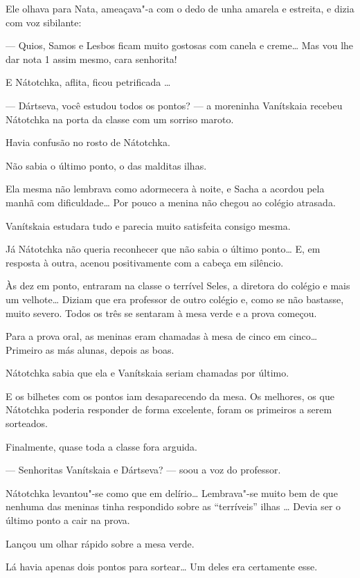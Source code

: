 Ele olhava para Nata, ameaçava"-a com o dedo de unha amarela e estreita,
e dizia com voz sibilante:

--- Quios, Samos e Lesbos ficam muito gostosas com canela e creme\ldots{} Mas
vou lhe dar nota 1 assim mesmo, cara senhorita!

E Nátotchka, aflita, ficou petrificada \ldots{}

\asterisc

--- Dártseva, você estudou todos os pontos? --- a moreninha Vanítskaia
recebeu Nátotchka na porta da classe com um sorriso maroto.

Havia confusão no rosto de Nátotchka.

Não sabia o último ponto, o das malditas ilhas.

Ela mesma não lembrava como adormecera à noite, e Sacha a acordou pela
manhã com dificuldade\ldots{} Por pouco a menina não chegou ao colégio
atrasada.

Vanítskaia estudara tudo e parecia muito satisfeita consigo mesma.

Já Nátotchka não queria reconhecer que não sabia o último ponto\ldots{} E, em
resposta à outra, acenou positivamente com a cabeça em silêncio.

Às dez em ponto, entraram na classe o terrível Seles, a diretora do
colégio e mais um velhote\ldots{} Diziam que era professor de outro colégio
e, como se não bastasse, muito severo. Todos os três se sentaram à mesa
verde e a prova começou.

Para a prova oral, as meninas eram chamadas à mesa de cinco em cinco\ldots{}
Primeiro as más alunas, depois as boas.

Nátotchka sabia que ela e Vanítskaia seriam chamadas por último.

E os bilhetes com os pontos iam desaparecendo da mesa. Os melhores, os
que Nátotchka poderia responder de forma excelente, foram os primeiros a
serem sorteados.

Finalmente, quase toda a classe fora arguida.

--- Senhoritas Vanítskaia e Dártseva? --- soou a voz do professor.

Nátotchka levantou"-se como que em delírio\ldots{} Lembrava"-se muito bem de
que nenhuma das meninas tinha respondido sobre as ``terríveis'' ilhas
\ldots{} Devia ser o último ponto a cair na prova.

Lançou um olhar rápido sobre a mesa verde.

Lá havia apenas dois pontos para sortear\ldots{} Um deles era certamente
esse.

